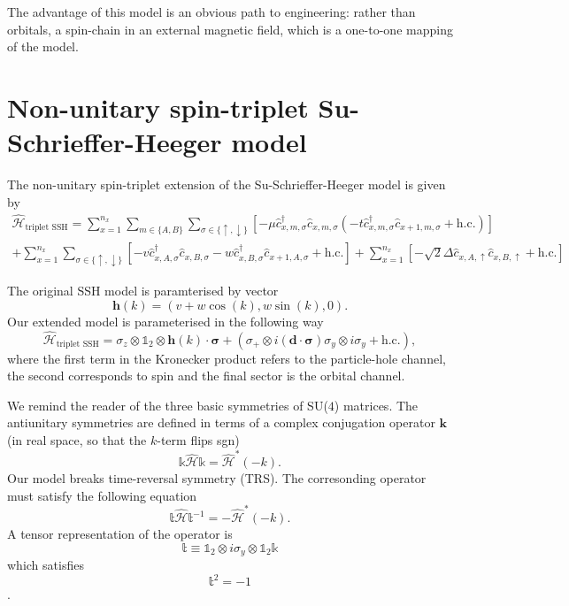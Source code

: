 The advantage of this model is an obvious path to engineering: rather than orbitals, 
a spin-chain in an external magnetic field, which is a one-to-one mapping of the model.

\section{\label{sec:spin-triplet_SSH} Non-unitary spin-triplet Su-Schrieffer-Heeger model}
The non-unitary spin-triplet extension of the Su-Schrieffer-Heeger model is given by
\begin{multline}
    \hat{\mathcal H}_\text{triplet SSH} =  
    \sum_{x=1}^{n_x} \sum_{m\in\{A,B\}} \sum_{\sigma\in\{\uparrow,\downarrow\}}
    \left[
-\mu \hat c_{x, m, \sigma}^\dagger \hat c_{x, m, \sigma}
(-t \hat c_{x, m, \sigma}^\dagger \hat c_{x+1, m, \sigma} 
+\text{h.c.})
\right]\\
    +
    \sum_{x=1}^{n_x}\sum_{\sigma\in\{\uparrow,\downarrow\}}
    \left[
    -v \hat c_{x, A, \sigma}^\dagger \hat c_{x, B, \sigma}
    -w \hat c_{x, B, \sigma}^\dagger \hat c_{x+1, A, \sigma}
    +\text{h.c.}
    \right]
    +
    \sum_{x=1}^{n_x}
    \left[
        -\sqrt{2}\Delta \hat c_{x, A, \uparrow}\hat c_{x, B,\uparrow}
    +\text{h.c.}
    \right]
\label{eq:spin-triplet_SSH}
\end{multline}

The original SSH model is paramterised by vector
\begin{equation}
    \mathbf{h}(k)=(v+w\cos{(k)},w\sin{(k)},0).
\end{equation}
Our extended model is parameterised in the following way
\begin{equation}
    \hat{\mathcal H}_\text{triplet SSH} = 
    \sigma_z\otimes\mathbb{1}_2\otimes\mathbf{h}(k)\cdot\bm{\sigma}
    +\left(
        \sigma_{+}\otimes i(\mathbf{d}\cdot\bm{\sigma})\sigma_y\otimes i\sigma_y
    +\text{h.c.}\right)
\label{eq:spin-triplet_SSH},
\end{equation}
where the first term in the Kronecker product refers to the particle-hole channel,
the second corresponds to spin and the final sector is the orbital channel. 

We remind the reader of the three basic symmetries of SU($4$) matrices. 
The antiunitary symmetries are defined in terms of a complex conjugation operator $\mathbf{k}$
(in real space, so that the $k$-term flips sgn)
\begin{equation}
    \mathbb{k}\hat{\mathcal H}\mathbb{k}=\hat{\mathcal H}^{*}(-k).
\end{equation}
Our model breaks time-reversal symmetry (TRS). The corresonding operator  
must satisfy the following equation
\begin{equation}
    \mathbb{t}\hat{\mathcal H}\mathbb{t}^{-1}=-\hat{\mathcal H}^{*}(-k).
\end{equation}
A tensor representation of the operator is
\begin{equation}
    \mathbb{t}\equiv\mathbb{1}_2\otimes i\sigma_y\otimes\mathbb{1}_2\mathbb{k}
\end{equation}
which satisfies
\begin{equation}
    \mathbb{t}^{2}=-1
\end{equation}.

